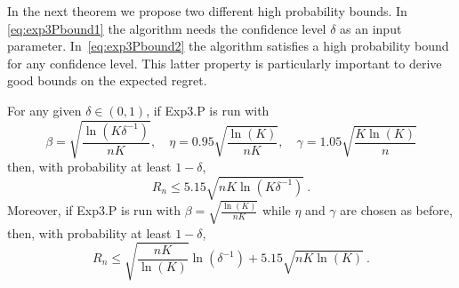 In the next theorem we propose two different high probability bounds. In \eqref{eq:exp3Pbound1} the algorithm needs the confidence level $\delta$ as an input parameter. In~\eqref{eq:exp3Pbound2} the algorithm satisfies a high probability bound for any confidence level. This latter property is particularly important to derive good bounds on the expected regret.
%
\begin{theorem} \label{th:exp3P}
For any given $\delta \in (0,1)$, if Exp3.P is run with
\[
    \beta = \sqrt{\frac{\ln(K \delta^{-1})}{n K}}, \quad \eta = 0.95 \sqrt{\frac{\ln(K)}{n K}}, \quad \gamma = 1.05 \sqrt{\frac{K \ln(K)}{n}}
\]
then, with probability at least $1-\delta$,
\begin{equation} \label{eq:exp3Pbound1}
R_n \leq 5.15 \sqrt{n K \ln(K \delta^{-1})}~.
\end{equation}
Moreover, if Exp3.P is run with
$
    \beta = \sqrt{\tfrac{\ln(K)}{n K}} %
$
while $\eta$ and $\gamma$ are chosen as before, then, with probability at least $1-\delta$,
\begin{equation} \label{eq:exp3Pbound2}
R_n \leq \sqrt{\frac{n K}{\ln(K)}} \ln(\delta^{-1}) + 5.15 \sqrt{n K \ln(K)}~.
\end{equation}
\end{theorem}
%
